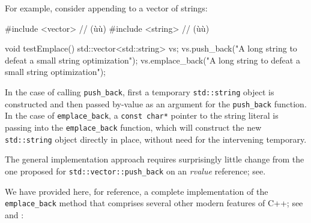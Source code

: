 For example, consider appending to a vector of strings:

\begin{emcppshiddenlisting}[emcppsbatch=e24]
#include <vector>  // (ù{}ù)
#include <string>  // (ù{}ù)
\end{emcppshiddenlisting}
\begin{emcppslisting}[emcppsbatch=e24]
void testEmplace()
{
    std::vector<std::string> vs;
    vs.push_back("A long string to defeat a small string optimization");
    vs.emplace_back("A long string to defeat a small string optimization");
}
\end{emcppslisting}
    

\noindent In the case of calling \lstinline!push_back!, first a temporary
\lstinline!std::string! object is constructed and then passed by-value as
an argument for the \lstinline!push_back! function. In the case of
\lstinline!emplace_back!, a \lstinline!const!~\lstinline!char*! pointer to the
string literal is passing into the \lstinline!emplace_back! function,
which will construct the new \lstinline!std::string! object directly in
place, without need for the intervening temporary.

The general implementation approach requires surprisingly little change
from the one proposed for \lstinline!std::vector::push_back! on an
\emph{rvalue} reference; see\linebreak[4] .

We have provided here, for reference, a complete implementation of the
\lstinline!emplace_back! method that comprises several other modern
features of C++; see  and
:


